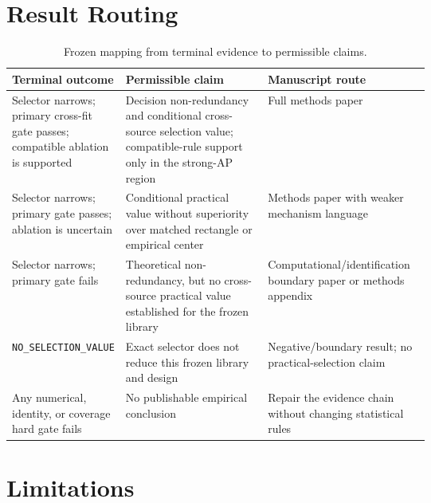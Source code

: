 \documentclass[preprint,review,12pt]{elsarticle}
\begin{document}
\section{Result Routing}

\begin{table}[H]
\centering
\caption{Frozen mapping from terminal evidence to permissible claims.}
\label{tab:routing}
\scriptsize
\begin{tabularx}{\linewidth}{>{\raggedright\arraybackslash}p{0.27\linewidth}
  >{\raggedright\arraybackslash}p{0.34\linewidth}X}
\toprule
Terminal outcome & Permissible claim & Manuscript route \\
\midrule
Selector narrows; primary cross-fit gate passes; compatible ablation is
supported & Decision non-redundancy and conditional cross-source selection
value; compatible-rule support only in the strong-AP region & Full methods
paper \\
Selector narrows; primary gate passes; ablation is uncertain & Conditional
practical value without superiority over matched rectangle or empirical center
& Methods paper with weaker mechanism language \\
Selector narrows; primary gate fails & Theoretical non-redundancy, but no
cross-source practical value established for the frozen library &
Computational/identification boundary paper or methods appendix \\
\texttt{NO\_SELECTION\_VALUE} & Exact selector does not reduce this frozen
library and design & Negative/boundary result; no practical-selection claim \\
Any numerical, identity, or coverage hard gate fails & No publishable empirical
conclusion & Repair the evidence chain without changing statistical rules \\
\bottomrule
\end{tabularx}
\end{table}

\section{Limitations}
\end{document}
